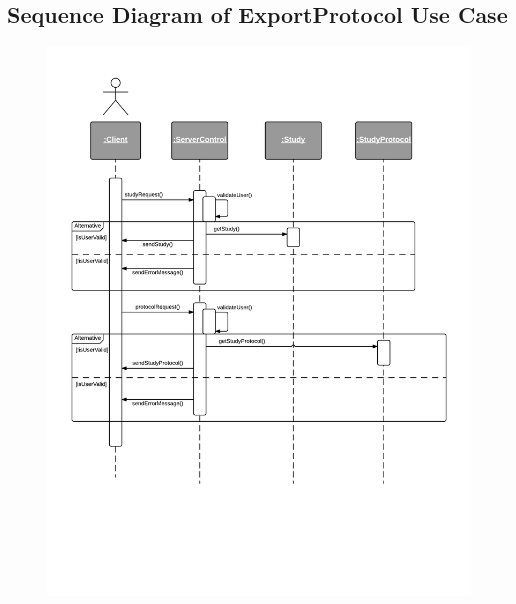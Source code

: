 \subsection{Sequence Diagram of ExportProtocol Use Case}
\begin{figure}[H]
  \includegraphics[width=45em]{section/DynamicModel/Sequence_Diagram_Export_Protocol}
  \label{fig:Sequence Diagram of ExportProtocol Use Case}
\end{figure}